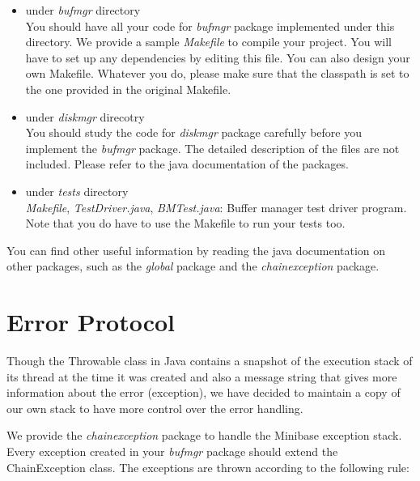 \begin{itemize}
\item under {\em bufmgr} directory \\
        You should have all your code for {\em bufmgr} package implemented
        under this directory.  We provide a sample {\em Makefile} to compile 
        your project. You will have to set up any dependencies by editing 
        this file.
	You can also design your own Makefile.  Whatever you do, please
        make sure that the classpath is set to the one provided in
        the original Makefile.

\item under {\em diskmgr} direcotry \\
        You should study the code for {\em diskmgr} package carefully before
        you implement the {\em bufmgr} package.  The detailed description
        of the files are not included.  Please refer to the java documentation
        of the packages.

\item under {\em tests} directory \\
	{\em Makefile}, {\em TestDriver.java}, {\em BMTest.java}: 
	Buffer manager test driver program.  Note that you do have to
        use the Makefile to run your tests too.
\end{itemize}

You can find other useful information by reading the java documentation
on other packages, such as the {\em global} package and the 
{\em chainexception} package.

\section{Error Protocol}

Though the Throwable class in Java contains a snapshot of the execution 
stack of its thread at the time it was created and also a message
string that gives more information about the error (exception), we have
decided to maintain a copy of our own stack to have more control over
the error handling.

We provide the {\em chainexception} package to handle the Minibase 
exception stack.  Every exception created in your {\em bufmgr} package
should extend the ChainException class.  The exceptions are thrown
according to the following rule:

